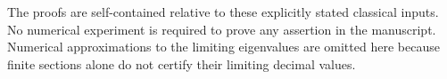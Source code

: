 The proofs are self-contained relative to these explicitly stated classical inputs. No numerical experiment is required to prove any assertion in the manuscript. Numerical approximations to the limiting eigenvalues are omitted here because finite sections alone do not certify their limiting decimal values.
